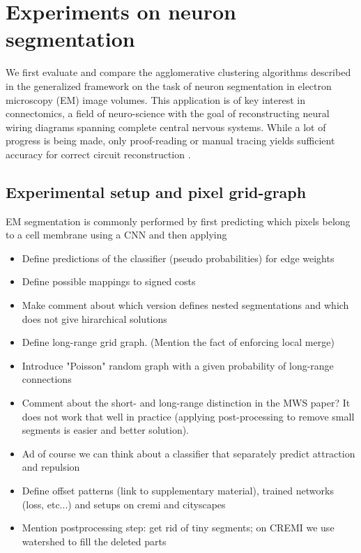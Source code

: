 \section{Experiments on neuron segmentation}

We first evaluate and compare the agglomerative clustering algorithms described in the generalized framework on the task of neuron segmentation in electron microscopy (EM) image volumes. This application is of key interest in connectomics, a field of neuro-science with the goal of reconstructing neural wiring diagrams spanning complete central nervous systems. While a lot of progress is being made, only proof-reading or manual tracing yields sufficient accuracy for correct circuit reconstruction \cite{schlegel2017learning}.

\subsection{Experimental setup and pixel grid-graph} \label{sec:grid_graph}
EM segmentation is commonly performed by first predicting which pixels belong to a cell membrane using a CNN and then applying 

\begin{itemize}
\item Define predictions of the classifier (pseudo probabilities) for edge weights
\item Define possible mappings to signed costs
\item Make comment about which version defines nested segmentations and which does not give hirarchical solutions

\end{itemize}


\begin{itemize}
    \item Define long-range grid graph. (Mention the fact of enforcing local merge)
\item Introduce "Poisson" random graph with a given probability of long-range connections
\item Comment about the short- and long-range distinction in the MWS paper? It does not work that well in practice (applying post-processing to remove small segments is easier and better solution).
\item Ad of course we can think about a classifier that separately predict attraction and repulsion
\item Define offset patterns (link to supplementary material), trained networks (loss, etc...) and setups on cremi and cityscapes 
\item Mention postprocessing step: get rid of tiny segments; on CREMI we use watershed to fill the deleted parts 
\end{itemize}
